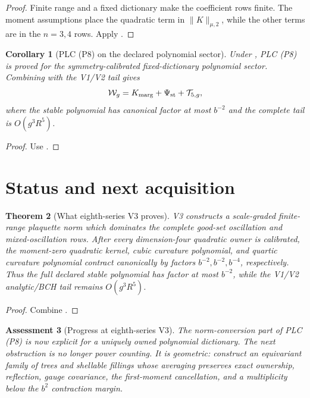 \documentclass[11pt,oneside]{book}
\newtheorem{theorem}{Theorem}[chapter]
\newtheorem{corollary}[theorem]{Corollary}
\newtheorem{assessment}[theorem]{Assessment}
\theoremstyle{definition}
\theoremstyle{remark}
\begin{document}
\begin{proof}
Finite range and a fixed dictionary make the coefficient rows finite.
The moment assumptions place the quadratic term in
\(\|K\|_{\mu,2}\), while the other terms are in the \(n=3,4\) rows.
Apply
.
\end{proof}

\begin{corollary}[PLC (P8) on the declared polynomial sector]
\label{cor:e8v3-PLC}
Under , PLC (P8) is proved for the
symmetry-calibrated fixed-dictionary polynomial sector.  Combining
with the V1/V2 tail gives
\[
 {\cal W}_g
 =
 K_{\rm marg}
 +\Psi_{\rm st}
 +{\cal T}_{5,g},                                    \label{eq:e8v3-final-split}
\]
where the stable polynomial has canonical factor at most \(b^{-2}\)
and the complete tail is \(O(g^3R^5)\).
\end{corollary}

\begin{proof}
Use
.
\end{proof}

\section{Status and next acquisition}
\label{sec:e8v3-status}

\begin{theorem}[What eighth-series V3 proves]
\label{thm:e8v3-result}
V3 constructs a scale-graded finite-range plaquette norm which
dominates the complete good-set oscillation and mixed-oscillation
rows.  After every dimension-four quadratic owner is calibrated, the
moment-zero quadratic kernel, cubic curvature polynomial, and quartic
curvature polynomial contract canonically by factors
\(b^{-2},b^{-2},b^{-4}\), respectively.  Thus the full declared stable
polynomial has factor at most \(b^{-2}\), while the V1/V2 analytic/BCH
tail remains \(O(g^3R^5)\).
\end{theorem}

\begin{proof}
Combine
.
\end{proof}

\begin{assessment}[Progress at eighth-series V3]
\label{ass:e8v3-status}
The norm-conversion part of PLC (P8) is now explicit for a uniquely
owned polynomial dictionary.  The next obstruction is no longer
power counting.  It is geometric: construct an equivariant family of
trees and shellable fillings whose averaging preserves exact
ownership, reflection, gauge covariance, the first-moment
cancellation, and a multiplicity below the \(b^2\) contraction margin.
\end{assessment}
\end{document}
